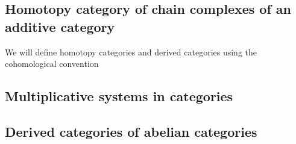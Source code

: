 


\subsection{Homotopy category of chain complexes of an additive category}

We will define homotopy categories and derived categories using the cohomological convention
















\subsection{Multiplicative systems in categories}






\subsection{Derived categories of abelian categories}



